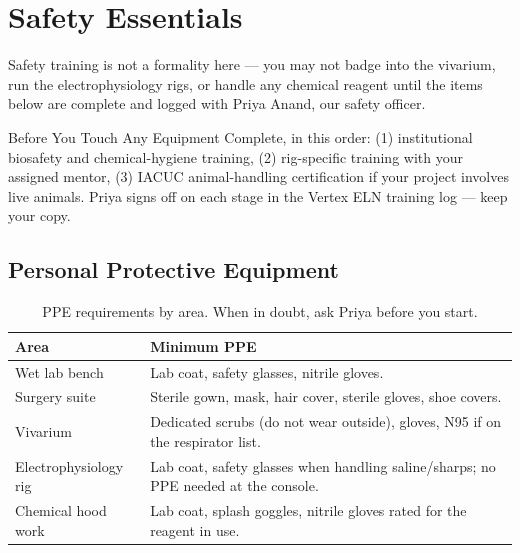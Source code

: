 \section{Safety Essentials}
\label{sec:safety}

Safety training is not a formality here --- you may not badge into the vivarium, run the
electrophysiology rigs, or handle any chemical reagent until the items below are complete and
logged with Priya Anand, our safety officer.

\begin{safetybox}{Before You Touch Any Equipment}
Complete, in this order: (1) institutional biosafety and chemical-hygiene training,
(2) rig-specific training with your assigned mentor, (3) IACUC animal-handling
certification if your project involves live animals. Priya signs off on each stage in the
Vertex ELN training log --- keep your copy.
\end{safetybox}

\subsection*{Personal Protective Equipment}
\begin{table}[h]
\centering
\small
\begin{tabular}{@{}p{3.3cm}p{10.2cm}@{}}
\toprule
\rowcolor{labpale}
\textbf{Area} & \textbf{Minimum PPE} \\
\midrule
Wet lab bench & Lab coat, safety glasses, nitrile gloves. \\
Surgery suite & Sterile gown, mask, hair cover, sterile gloves, shoe covers. \\
Vivarium & Dedicated scrubs (do not wear outside), gloves, N95 if on the respirator list. \\
Electrophysiology rig & Lab coat, safety glasses when handling saline/sharps; no PPE needed at the console. \\
Chemical hood work & Lab coat, splash goggles, nitrile gloves rated for the reagent in use. \\
\bottomrule
\end{tabular}
\caption{PPE requirements by area. When in doubt, ask Priya before you start.}
\end{table}

